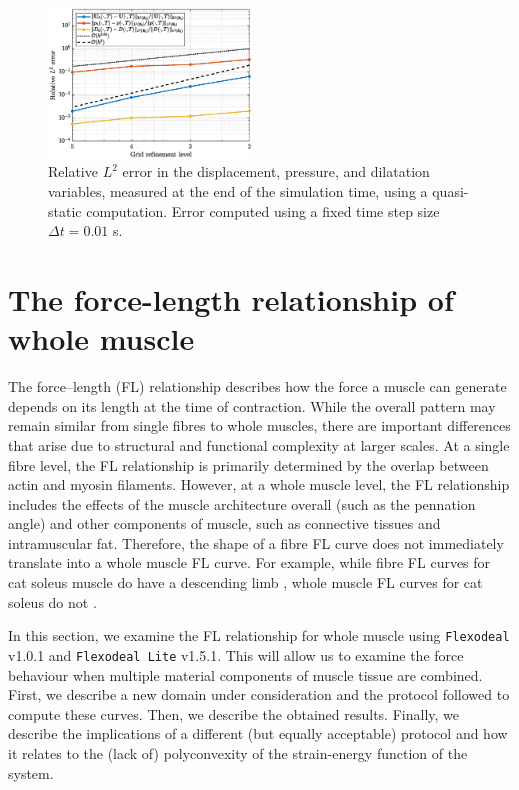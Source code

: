 \documentclass{sfuthesis}
\numberwithin{equation}{section}
\numberwithin{figure}{chapter}
\numberwithin{table}{chapter}
\theoremstyle{definition}
\begin{document}
\begin{figure}
    \centering
    \includegraphics[width=0.48\textwidth]{convergence-study-quasi-static.eps}
    \caption{Relative $L^2$ error in the displacement, pressure, and dilatation variables, measured at the end of the simulation time, using a quasi-static computation. Error computed using a fixed time step size $\Delta t = 0.01$ \unit{s}.\label{fig:convergence_quasistatic}}
\end{figure}



\section{The force-length relationship of whole muscle} \label{sec:flexodeal_fl_curves}

The force–length (FL) relationship describes how the force a muscle can generate depends on its length at the time of contraction. While the overall pattern may remain similar from single fibres to whole muscles, there are important differences that arise due to structural and functional complexity at larger scales. At a single fibre level, the FL relationship is primarily determined by the overlap between actin and myosin filaments. However, at a whole muscle level, the FL relationship includes the effects of the muscle architecture overall (such as the pennation angle) and other components of muscle, such as connective tissues and intramuscular fat. Therefore, the shape of a fibre FL curve does not immediately translate into a whole muscle FL curve. For example, while fibre FL curves for cat soleus muscle do have a descending limb \cite{ScottBrownLoeb1996-1,VazDeLaRocha2012}, whole muscle FL curves for cat soleus do not \cite{Gareis1992}.

In this section, we examine the FL relationship for whole muscle using \texttt{Flexodeal} v1.0.1 and \texttt{Flexodeal Lite} v1.5.1. This will allow us to examine the force behaviour when multiple material components of muscle tissue are combined. First, we describe a new domain under consideration and the protocol followed to compute these curves. Then, we describe the obtained results. Finally, we describe the implications of a different (but equally acceptable) protocol and how it relates to the (lack of) polyconvexity of the strain-energy function of the system.
\end{document}
